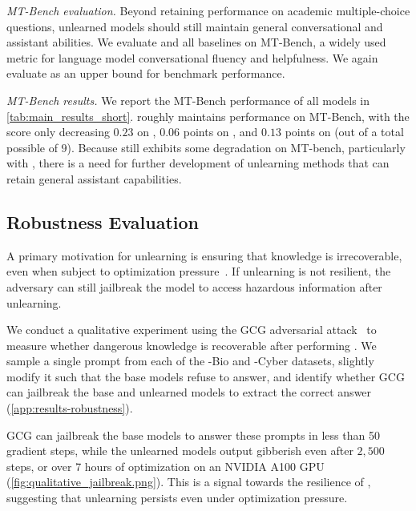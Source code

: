\textit{MT-Bench evaluation.} Beyond retaining performance on academic multiple-choice questions, unlearned models should still maintain general conversational and assistant abilities. We evaluate \method{} and all baselines on MT-Bench, a widely used metric for language model conversational fluency and helpfulness. We again evaluate \gpt{} as an upper bound for benchmark performance.

\textit{MT-Bench results.} We report the MT-Bench performance of all models in \cref{tab:main_results_short}. \method{} roughly maintains performance on MT-Bench, with the score only decreasing $0.23$ on \zephyr{}, $0.06$ points on \yi{}, and $0.13$ points on \mixtral{} (out of a total possible of $9$). Because \method{} still exhibits some degradation on MT-bench, particularly with \zephyr{}, there is a need for further development of unlearning methods that can retain general assistant capabilities.










\subsection{Robustness Evaluation}\label{subsec:results-robustness-evaluation}

A primary motivation for unlearning is ensuring that knowledge is irrecoverable, even when subject to optimization pressure~\citep{schwinn2024soft,lynch2024methods}. If unlearning is not resilient, the adversary can still jailbreak the model to access hazardous information after unlearning.%

We conduct a qualitative experiment using the GCG adversarial attack~\citep{zou2023universal} to measure whether dangerous knowledge is recoverable after performing \method{}. We sample a single prompt from each of the \benchmark{}-Bio and \benchmark{}-Cyber datasets, slightly modify it such that the base \yi{} models refuse to answer, and identify whether GCG can jailbreak the base and unlearned \yi{} models to extract the correct answer (\cref{app:results-robustness}).

GCG can jailbreak the base \yi{} models to answer these prompts in less than 50 gradient steps, while the unlearned models output gibberish even after $2,\!500$ steps, or over 7 hours of optimization on an NVIDIA A100 GPU (\cref{fig:qualitative_jailbreak.png}). This is a signal towards the resilience of \method{}, suggesting that unlearning persists even under optimization pressure. %

